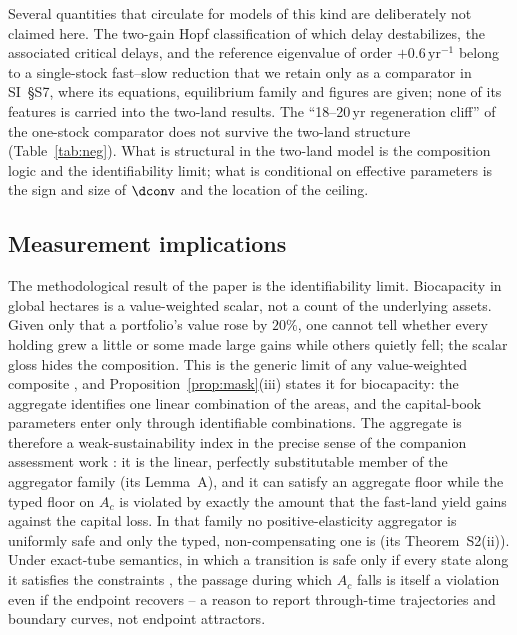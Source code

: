 Several quantities that circulate for models of this kind are deliberately not claimed here. The two-gain Hopf classification of which delay destabilizes, the associated critical delays, and the reference eigenvalue of order $+0.6\,\mathrm{yr}^{-1}$ belong to a single-stock fast--slow reduction that we retain only as a comparator in SI~\S S7, where its equations, equilibrium family and figures are given; none of its features is carried into the two-land results. The ``18--20\,yr regeneration cliff'' of the one-stock comparator does not survive the two-land structure (Table~\ref{tab:neg}). What is structural in the two-land model is the composition logic and the identifiability limit; what is conditional on effective parameters is the sign and size of $\dconv$ and the location of the ceiling.

\subsection{Measurement implications}

The methodological result of the paper is the identifiability limit. Biocapacity in global hectares is a value-weighted scalar, not a count of the underlying assets. Given only that a portfolio's value rose by $20\%$, one cannot tell whether every holding grew a little or some made large gains while others quietly fell; the scalar gloss hides the composition. This is the generic limit of any value-weighted composite \citep{Nardo2008}, and Proposition~\ref{prop:mask}(iii) states it for biocapacity: the aggregate identifies one linear combination of the areas, and the capital-book parameters enter only through identifiable combinations. The aggregate is therefore a weak-sustainability index in the precise sense of the companion assessment work \citep{Abaee2026b}: it is the linear, perfectly substitutable member of the aggregator family (its Lemma~A), and it can satisfy an aggregate floor while the typed floor on $A_c$ is violated by exactly the amount that the fast-land yield gains against the capital loss. In that family no positive-elasticity aggregator is uniformly safe and only the typed, non-compensating one is (its Theorem~S2(ii)). Under exact-tube semantics, in which a transition is safe only if every state along it satisfies the constraints \citep{Abaee2026b}, the passage during which $A_c$ falls is itself a violation even if the endpoint recovers -- a reason to report through-time trajectories and boundary curves, not endpoint attractors.

